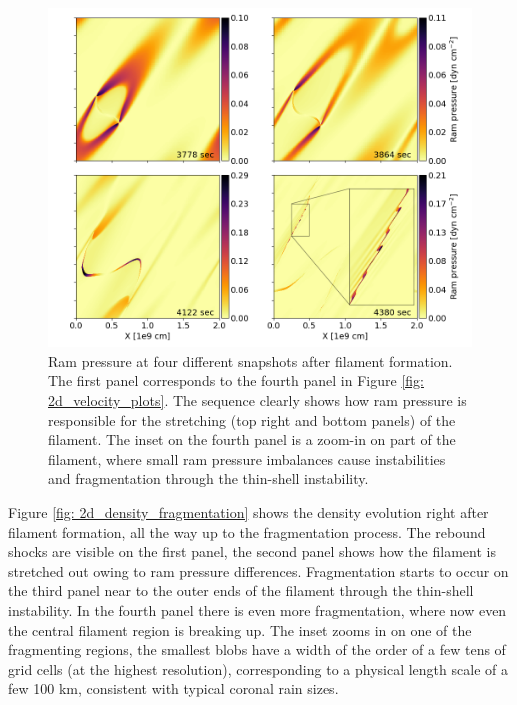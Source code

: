 \begin{figure}[t]
  \centering
  \includegraphics[width=\textwidth]{2d_ram_pressure.png}
  \caption{
    Ram pressure at four different snapshots after filament formation. The first panel corresponds to the fourth panel in Figure \ref{fig: 2d_velocity_plots}. The sequence clearly shows how ram pressure is responsible for the stretching (top right and bottom panels) of the filament. The inset on the fourth panel is a zoom-in on part of the filament, where small ram pressure imbalances cause instabilities and fragmentation through the thin-shell instability.
  }
  \label{fig: 2d_ram_pressure}
\end{figure}

Figure \ref{fig: 2d_density_fragmentation} shows the density evolution right after filament formation, all the way up to the fragmentation process. The rebound shocks are visible on the first panel, the second panel shows how the filament is stretched out owing to ram pressure differences. Fragmentation starts to occur on the third panel near to the outer ends of the filament through the thin-shell instability. In the fourth panel there is even more fragmentation, where now even the central filament region is breaking up. The inset zooms in on one of the fragmenting regions, the smallest blobs have a width of the order of a few tens of grid cells (at the highest resolution), corresponding to a physical length scale of a few 100 km, consistent with typical coronal rain sizes.

